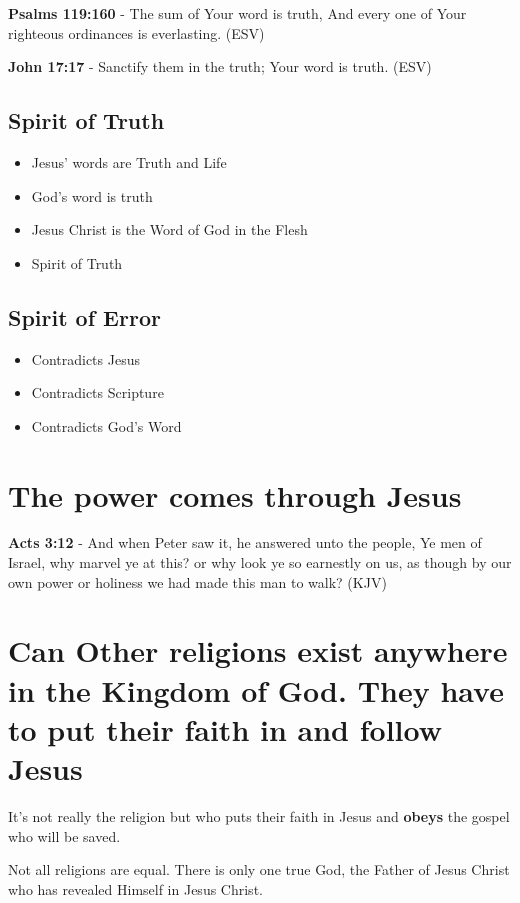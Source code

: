 \documentclass[11pt]{article}
\begin{document}
\textbf{Psalms 119:160} - The sum of Your word is truth, And every one of Your righteous ordinances is everlasting. (ESV)

\textbf{John 17:17} - Sanctify them in the truth; Your word is truth. (ESV)

\subsection{Spirit of Truth}
\label{sec:org3169324}
\begin{itemize}
\item Jesus' words are Truth and Life
\item God's word is truth
\item Jesus Christ is the Word of God in the Flesh
\item Spirit of Truth
\end{itemize}

\subsection{Spirit of Error}
\label{sec:org7cb44cb}
\begin{itemize}
\item Contradicts Jesus
\item Contradicts Scripture
\item Contradicts God's Word
\end{itemize}

\section{The power comes through Jesus}
\label{sec:orga72f0e9}
\textbf{Acts 3:12} - And when Peter saw it, he answered unto the people, Ye men of Israel, why marvel ye at this? or why look ye so earnestly on us, as though by our own power or holiness we had made this man to walk? (KJV)

\section{Can Other religions exist anywhere in the Kingdom of God. They have to put their faith in and follow Jesus}
\label{sec:org4cbb4a8}
It's not really the religion but who puts their faith in Jesus and \textbf{obeys} the gospel who will be saved.

Not all religions are equal.
There is only one true God, the Father of Jesus Christ who has revealed Himself in Jesus Christ.
\end{document}
